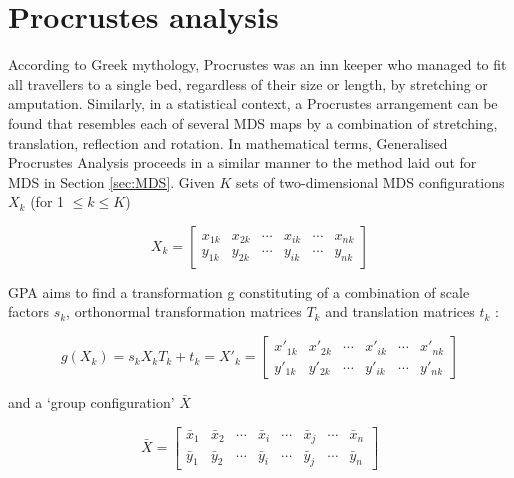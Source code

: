 \documentclass{article}
\begin{document}
\section{Procrustes analysis}
\label{sec:procrustes}

According to Greek mythology, Procrustes was an inn keeper who managed
to fit all travellers to a single bed, regardless of their size or
length, by stretching or amputation. Similarly, in a statistical
context, a Procrustes arrangement can be found that resembles each of
several MDS maps by a combination of stretching, translation,
reflection and rotation. In mathematical terms, Generalised Procrustes
Analysis \citep[GPA,][]{gower1975, gower2004, borg2005} proceeds in a
similar manner to the method laid out for MDS in Section
\ref{sec:MDS}. Given $K$ sets of two-dimensional MDS configurations
$X_k$ (for 1 $\leq k \leq K$)

\begin{equation}
X_k = \left[
\begin{array}{cccccc}
x_{1k} & x_{2k} & \cdots & x_{ik} & \cdots & x_{nk}\\
y_{1k} & y_{2k} & \cdots & y_{ik} & \cdots & y_{nk}
\end{array}
\right]
\label{eq:Xk}
\end{equation}

GPA aims to find a transformation g constituting of a combination of
scale factors $s_k$, orthonormal transformation matrices $T_k$ and
translation matrices $t_k$ \citep{borg2005}:

\begin{equation}
g(X_k) = s_k X_k T_k + t_k = X'_k = \left[
\begin{array}{cccccc}
x'_{1k} & x'_{2k} & \cdots & x'_{ik} & \cdots & x'_{nk}\\
y'_{1k} & y'_{2k} & \cdots & y'_{ik} & \cdots & y'_{nk}
\end{array}
\right]
\label{eq:g}
\end{equation}

and a `group configuration' $\bar{X}$

\begin{equation}
\bar{X} = \left[
\begin{array}{cccccccc}
\bar{x}_{1} & \bar{x}_{2} & \cdots & \bar{x}_{i} & \cdots & \bar{x}_{j} & \cdots & \bar{x}_{n}\\
\bar{y}_{1} & \bar{y}_{2} & \cdots & \bar{y}_{i} & \cdots & \bar{y}_{j} & \cdots & \bar{y}_{n}
\end{array}
\right]
\label{eq:Xbar}
\end{equation}
\end{document}
